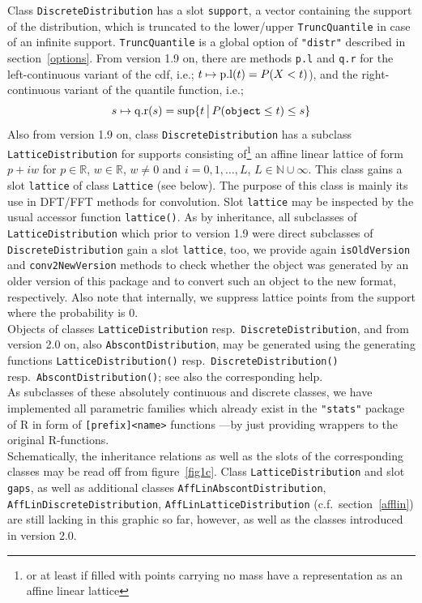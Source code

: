 \documentclass[11pt]{article}
\newcommand{\code}[1]{{\tt #1}}
\newcommand{\pkg}[1]{{\tt "#1"}}
\newcommand{\R}{\mathbb{R}}
\newcommand{\N}{\mathbb{N}}
\begin{document}
Class \code{DiscreteDistribution} has a slot \code{support}, a vector containing
the support of the distribution, which is truncated to the lower/upper
\code{TruncQuantile} in case of an infinite support. \code{TruncQuantile} is a
global option of  \pkg{distr} described in section~{\ref{options}}.
From version 1.9 on, there are methods \code{p.l} and \code{q.r} for the
left-continuous variant of the cdf, i.e.; $t\mapsto {\rm p.l}(t)=P(X<t)$), and the
right-continuous variant of the quantile function, i.e.;
$$
s\mapsto {\rm q.r}(s)=\sup\{t \,\big|\, P({\tt object}\leq t)\leq s\}
$$
Also from version 1.9 on, class \code{DiscreteDistribution} has a subclass
\code{LatticeDistribution} for supports consisting of\footnote{or at least
if filled with points carrying no mass have a representation as an affine linear
lattice} an affine linear lattice of form $p+iw$ for $p\in\R$, $w\in\R$,
$w\not=0$ and $i=0,1,\ldots,L$,
$L\in\N \cup\infty$. This class gains a slot \code{lattice} of
class \code{Lattice} (see below). The purpose of this class is mainly its use
in DFT/FFT methods for convolution. Slot \code{lattice} may be
inspected by the usual accessor function \code{lattice()}.
As by inheritance, all subclasses of \code{LatticeDistribution} which prior to
version 1.9 were direct subclasses of \code{DiscreteDistribution} gain a
slot \code{lattice}, too, we provide again \code{isOldVersion} and
\code{conv2NewVersion} methods to check whether the object was generated by an
older version of this package and to convert such an object to the new
format, respectively. Also note that internally, we suppress lattice points from
the support where the probability is $0$.\\


Objects of classes \code{LatticeDistribution} resp.\
\code{DiscreteDistribution}, and from version 2.0 on, also
\code{AbscontDistribution},  may be generated using the generating functions
\code{LatticeDistribution()} resp.\ \code{DiscreteDistribution()}
resp.\ \code{AbscontDistribution()}; see also
the corresponding help.
\\
As subclasses of these absolutely continuous and discrete classes, we have
implemented all parametric families which already exist in the  \pkg{stats}
package of {\sf R} in form of
{\tt [prefix]<name>} functions ---by just providing wrappers to the original
{\sf R}-functions.\\
%
Schematically, the inheritance relations as well as the slots
of  the corresponding classes may be read off from figure~\ref{fig1c}.
Class \code{LatticeDistribution} and slot \code{gaps}, as well as
additional classes \code{AffLinAbscontDistribution},
\code{AffLinDiscreteDistribution}, \code{AffLinLatticeDistribution}
(c.f.\ section~\ref{afflin}) are still lacking in this graphic so far, however,
as well as the classes introduced in version 2.0.
\\
\end{document}
